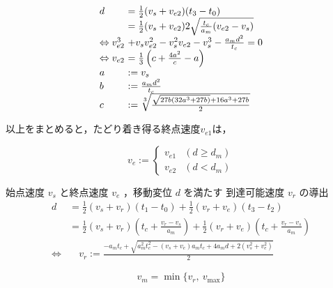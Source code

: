 \documentclass[a5paper]{ltjsarticle}
\begin{document}
$$
    \begin{array}{l@{~}l}
        d        & =                                                         \frac{1}{2}(v_s+v_{e2})(t_3-t_0)
        \\
                 & =                                                         \frac{1}{2}(v_s+v_{e2})2\sqrt{\frac{t_c}{a_m}(v_{e2}-v_s)}
        \\
        \Leftrightarrow
        v_{e2}^3 & + v_s v_{e2}^2-v_s^2v_{e2}-v_s^3-\frac{a_md^2}{t_c} = 0
        \\
        \Leftrightarrow
        v_{e2}   & =
        \frac{1}{3}\left(c +\frac{4a^2}{c}
        -a
        \right)
        \\
        a        & := v_s
        \\
        b        & :=                                                        \frac{a_md^2}{t_c}
        \\
        c        & :=                                                        \sqrt[3]{\frac{\sqrt{27b(32a^3+27b)} + 16a^3+27b}{2}}
    \end{array}
$$

以上をまとめると，たどり着き得る終点速度$v_{e1}$は，

$$
    v_{e} :=
    \left\{\begin{array}{ll}
        v_{e1} & (d        \ge d_m) \\
        v_{e2} & (d < d_m)
    \end{array}\right.
$$

始点速度 $v_s$ と終点速度 $v_e$ ，移動変位 $d$ を満たす
到達可能速度 $v_r$ の導出
\begin{align}
    d               & =
    \frac{1}{2}(v_s+v_r)(t_1-t_0)+
    \frac{1}{2}(v_r+v_e)(t_3-t_2)
    \\
                    & =
    \frac{1}{2}(v_s+v_r)\left(t_c+\frac{v_r-v_s}{a_m}\right)+
    \frac{1}{2}(v_r+v_e)\left(t_c+\frac{v_r-v_s}{a_m}\right)
    \\
    \Leftrightarrow & \quad
    v_r := \frac{-a_mt_c + \sqrt{a_m^2t_c^2-(v_s+v_e)a_mt_c+4a_md+2(v_s^2+v_e^2)}}{2}
\end{align}

$$
    v_m = \min\{v_r,~v_{\max} \}
$$
\end{document}
